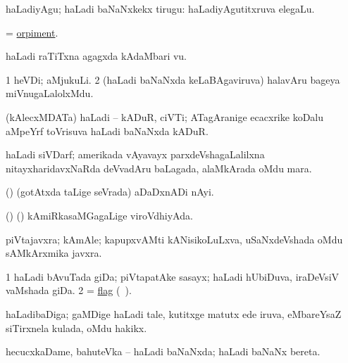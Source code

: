 \noindent
\gl{\akirx} 
\bmng
haLadiyAgu; haLadi baNaNxkekx tirugu:  haLadiyAgutitxruva elegaLu.
\emng
\eentry

\bentry
{}
\gl{\nA} 
\bmng
= \hyperref{kandict_o.pdf}{O}{orpiment}{orpiment}.
\emng
\eentry

\bentry
{} 
\gl{\nA} 
\bmng
haLadi raTiTxna agagxda kAdaMbari \mo vu.
\emng
\eentry

\bentry
{} 
\gl{\nA} 
\bmng
\bnum
\num{1} heVDi; aMjukuLi. 
\num{2} (haLadi baNaNxda keLaBAgaviruva) halavAru bageya miVnugaLalolxMdu.
\enum
\emng 
\eentry

\bentry
{}
\gl{\nA} 
\bmng
(kAlecxMDATa) haLadi -- kADuR, ciVTi; ATagAranige ecacxrike koDalu aMpeYrf toVrisuva haLadi baNaNxda kADuR.
\emng
\eentry

\bentry
{}
\gl{\nA} 
\bmng
haLadi siVDarf; amerikada vAyavayx parxdeVshagaLalilxna nitayxharidavxNaRda deVvadAru baLagada, alaMkArada oMdu mara.
\emng
\eentry

\bentry
{} 
\gl{\nA} 
\bmng
(\ame)
(gotAtxda taLige seVrada) aDaDxnADi nAyi.
\emng
\eentry

\bentry
{} 
\gl{\gu} 
\bmng
(\ame) (\rUpa) 
kAmiRkasaMGagaLige viroVdhiyAda.
\emng
\eentry

\bentry
{}
\gl{\nA} 
\bmng
piVtajavxra; kAmAle; kapupxvAMti kANisikoLuLxva,  uSaNxdeVshada oMdu  sAMkArxmika javxra.
\emng
\eentry

\bentry
{}
\gl{\nA} 
\bmng
\bnum
\num{1} haLadi bAvuTada giDa; piVtapatAke sasayx; haLadi hUbiDuva, iraDeVsiV vaMshada giDa. 
\num{2} = \hyperref{kandict_f.pdf}{F}{flag pagu(7)}{flag} (\pagu\ ).
\enum
\emng
\eentry

\bentry
{} 
\gl{\nA} 
\bmng
haLadibaDiga; gaMDige haLadi tale, kutitxge matutx ede iruva, eMbareYsaZ siTirxnela kulada, oMdu hakikx.
\emng 
\eentry

\bentry
{} 
\gl{\gu} 
\bmng
hecucxkaDame, bahuteVka -- haLadi baNaNxda; haLadi baNaNx bereta.
\emng
\eentry

